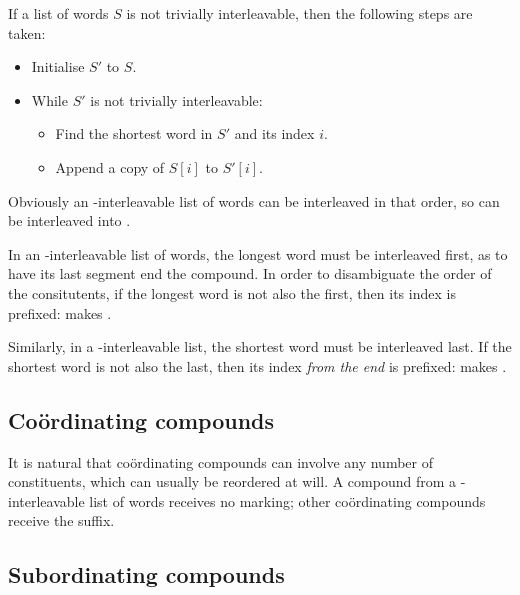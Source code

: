 \documentclass{book}
\begin{document}
If a list of words $S$ is not trivially interleavable, then the following steps are taken:

\begin{itemize}
  \item Initialise $S'$ to $S$.
  \item While $S'$ is not trivially interleavable:
  \begin{itemize}
    \item Find the shortest word in $S'$ and its index $i$.
    \item Append a copy of $S[i]$ to $S'[i]$.
  \end{itemize}
\end{itemize}

Obviously an \tieq-interleavable list of words can be interleaved in that order, so  can be interleaved into .

In an \tiaug-interleavable list of words, the longest word must be interleaved first, as to have its last segment end the compound. In order to disambiguate the order of the consitutents, if the longest word is not also the first, then its index is prefixed:  makes .

Similarly, in a \tidim-interleavable list, the shortest word must be interleaved last. If the shortest word is not also the last, then its index \emph{from the end} is prefixed:  makes .

\subsection{Coördinating compounds}

It is natural that coördinating compounds can involve any number of constituents, which can usually be reordered at will. A compound from a \tieq-interleavable list of words receives no marking; other coördinating compounds receive the  suffix.

\subsection{Subordinating compounds}
\end{document}

